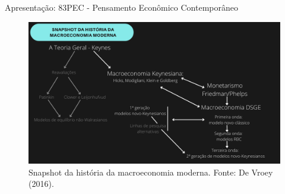 \documentclass[10pt]{beamer}
\begin{document}
\begin{frame}[plain]{Apresentação: 83PEC - Pensamento Econômico Contemporâneo}
    \begin{figure}
        \centering
        \hspace*{-9mm}
        \includegraphics[width=.8\textwidth]{./figures/snapchot}
        \caption{Snapshot da história da macroeconomia moderna. Fonte: De Vroey (2016).}
        \label{fig.snap}
    \end{figure}
\end{frame}
\end{document}
